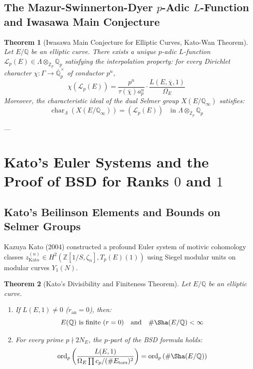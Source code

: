 \documentclass[11pt,a4paper]{article}
\newtheorem{theorem}{Theorem}[section]
\theoremstyle{definition}
\begin{document}
\subsection{\texorpdfstring{The Mazur-Swinnerton-Dyer $p$-Adic $L$-Function and Iwasawa Main Conjecture}{The Mazur-Swinnerton-Dyer p-Adic L-Function and Iwasawa Main Conjecture}}
\begin{theorem}[Iwasawa Main Conjecture for Elliptic Curves, Kato-Wan Theorem]
Let $E/\mathbb{Q}$ be an elliptic curve. There exists a unique $p$-adic $L$-function $\mathcal{L}_p(E) \in \Lambda \otimes_{\mathbb{Z}_p} \mathbb{Q}_p$ satisfying the interpolation property: for every Dirichlet character $\chi : \Gamma \to \overline{\mathbb{Q}}_p^\times$ of conductor $p^n$,
\begin{equation}
\chi(\mathcal{L}_p(E)) = \frac{p^{n}}{\tau(\overline{\chi}) a_p^n} \cdot \frac{L(E, \overline{\chi}, 1)}{\Omega_E}
\end{equation}
Moreover, the characteristic ideal of the dual Selmer group $X(E/\mathbb{Q}_\infty)$ satisfies:
\begin{equation}
\operatorname{char}_{\Lambda}(X(E/\mathbb{Q}_\infty)) = \left(\mathcal{L}_p(E)\right) \quad \text{in } \Lambda \otimes_{\mathbb{Z}_p} \mathbb{Q}_p
\end{equation}
\end{theorem}

---

\section{\texorpdfstring{Kato's Euler Systems and the Proof of BSD for Ranks $0$ and $1$}{Kato's Euler Systems and the Proof of BSD for Ranks 0 and 1}}

\subsection{Kato's Beilinson Elements and Bounds on Selmer Groups}
Kazuya Kato (2004) constructed a profound Euler system of motivic cohomology classes $z_{\mathrm{Kato}}^{(n)} \in H^2(\mathbb{Z}[1/S, \zeta_n], T_p(E)(1))$ using Siegel modular units on modular curves $Y_1(N)$.

\begin{theorem}[Kato's Divisibility and Finiteness Theorem]
Let $E/\mathbb{Q}$ be an elliptic curve.
\begin{enumerate}
    \item If $L(E, 1) \neq 0$ ($r_{\mathrm{an}} = 0$), then:
    \begin{equation}
    E(\mathbb{Q}) \text{ is finite } (r = 0) \quad \text{and} \quad \#\Sha(E/\mathbb{Q}) < \infty
    \end{equation}
    \item For every prime $p \nmid 2 N_E$, the $p$-part of the BSD formula holds:
    \begin{equation}
    \operatorname{ord}_p \left( \frac{L(E,1)}{\Omega_E \prod c_p / (\#E_{\mathrm{tors}})^2} \right) = \operatorname{ord}_p\left(\#\Sha(E/\mathbb{Q})\right)
    \end{equation}
\end{enumerate}
\end{theorem}
\end{document}
